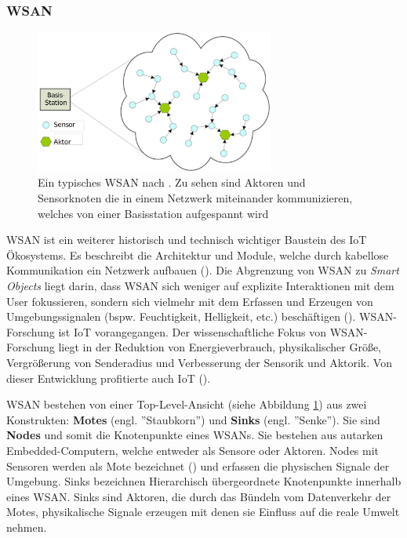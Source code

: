 \subsubsection{\acl{WSAN}}\label{subsubsec:wsan}
\begin{figure}[h]
    \centering
    \includegraphics[width=0.7\textwidth]{bilder/chapter2/wsan.pdf}
    \caption{Ein typisches \ac{WSAN} nach \cite{feng2008wsan}. Zu sehen sind Aktoren und Sensorknoten die in einem Netzwerk miteinander kommunizieren, welches von einer Basisstation aufgespannt wird}
    \label{fig:WSAN}
\end{figure}
\ac{WSAN} ist ein weiterer historisch und technisch wichtiger Baustein des \ac{IoT} Ökosystems. Es beschreibt die Architektur und Module, welche durch kabellose Kommunikation ein Netzwerk aufbauen (\cite{ferrara2013smart}). Die Abgrenzung von \ac{WSAN} zu \textit{Smart Objects} liegt darin, dass \ac{WSAN} sich weniger auf explizite Interaktionen mit dem User fokussieren, sondern sich vielmehr mit dem Erfassen und Erzeugen von Umgebungssignalen (bspw. Feuchtigkeit, Helligkeit, etc.) beschäftigen (\cite{Madakam2015litRev}). \ac{WSAN}-Forschung ist \ac{IoT} vorangegangen. Der wissenschaftliche Fokus von \ac{WSAN}-Forschung liegt in der Reduktion von Energieverbrauch, physikalischer Größe, Vergrößerung von Senderadius und Verbesserung der Sensorik und Aktorik. Von dieser Entwicklung profitierte auch \ac{IoT} (\cite{lopez2011taxonomy}).

\ac{WSAN} bestehen von einer Top-Level-Ansicht (siehe Abbildung \ref{fig:WSAN}) aus zwei Konstrukten: \textbf{Motes} (engl. ''Staubkorn'') und \textbf{Sinks} (engl. ''Senke''). Sie sind \textbf{Nodes} und somit die Knotenpunkte eines \acp{WSAN}. Sie bestehen aus autarken Embedded-Computern, welche entweder als Sensore oder Aktoren. Nodes mit Sensoren werden als Mote bezeichnet (\cite{salarian2012coordination}) und erfassen die physischen Signale der Umgebung. Sinks bezeichnen Hierarchisch übergeordnete Knotenpunkte innerhalb eines \ac{WSAN}. Sinks sind Aktoren, die durch das Bündeln vom Datenverkehr der Motes, physikalische Signale erzeugen mit denen sie Einfluss auf die reale Umwelt nehmen.

